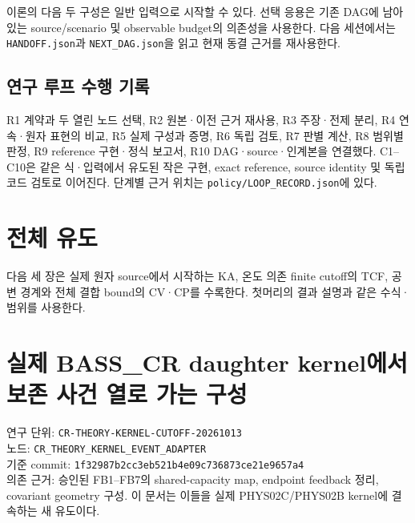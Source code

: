 \documentclass[11pt,a4paper]{article}
\begin{document}
이론의 다음 두 구성은 일반 입력으로 시작할 수 있다. 선택 응용은 기존 DAG에 남아 있는 source/scenario 및 observable budget의 의존성을 사용한다. 다음 세션에서는 \texttt{HANDOFF.json}과 \texttt{NEXT\_DAG.json}을 읽고 현재 동결 근거를 재사용한다.

\hypertarget{uxc5f0uxad6c-uxb8e8uxd504-uxc218uxd589-uxae30uxb85d}{%
\subsection{연구 루프 수행 기록}\label{uxc5f0uxad6c-uxb8e8uxd504-uxc218uxd589-uxae30uxb85d}}

R1 계약과 두 열린 노드 선택, R2 원본·이전 근거 재사용, R3 주장·전제 분리, R4 연속·원자 표현의 비교, R5 실제 구성과 증명, R6 독립 검토, R7 판별 계산, R8 범위별 판정, R9 reference 구현·정식 보고서, R10 DAG·source·인계본을 연결했다. C1--C10은 같은 식·입력에서 유도된 작은 구현, exact reference, source identity 및 독립 코드 검토로 이어진다. 단계별 근거 위치는 \texttt{policy/LOOP\_RECORD.json}에 있다.

\hypertarget{uxc804uxccb4-uxc720uxb3c4}{%
\section{전체 유도}\label{uxc804uxccb4-uxc720uxb3c4}}

다음 세 장은 실제 원자 source에서 시작하는 KA, 온도 의존 finite cutoff의 TCF, 공변 경계와 전체 결합 bound의 CV·CP를 수록한다. 첫머리의 결과 설명과 같은 수식·범위를 사용한다.

\clearpage

\hypertarget{uxc2e4uxc81c-bass_cr-daughter-kerneluxc5d0uxc11c-uxbcf4uxc874-uxc0acuxac74-uxc5f4uxb85c-uxac00uxb294-uxad6cuxc131}{%
\section{실제 BASS\_CR daughter kernel에서 보존 사건 열로 가는 구성}\label{uxc2e4uxc81c-bass_cr-daughter-kerneluxc5d0uxc11c-uxbcf4uxc874-uxc0acuxac74-uxc5f4uxb85c-uxac00uxb294-uxad6cuxc131}}

연구 단위: \nolinkurl{CR-THEORY-KERNEL-CUTOFF-20261013}\\
노드: \nolinkurl{CR_THEORY_KERNEL_EVENT_ADAPTER}\\
기준 commit: \nolinkurl{1f32987b2cc3eb521b4e09c736873ce21e9657a4}\\
의존 근거: 승인된 FB1--FB7의 shared-capacity map, endpoint feedback 정리, covariant geometry 구성. 이 문서는 이들을 실제 PHYS02C/PHYS02B kernel에 결속하는 새 유도이다.
\end{document}
